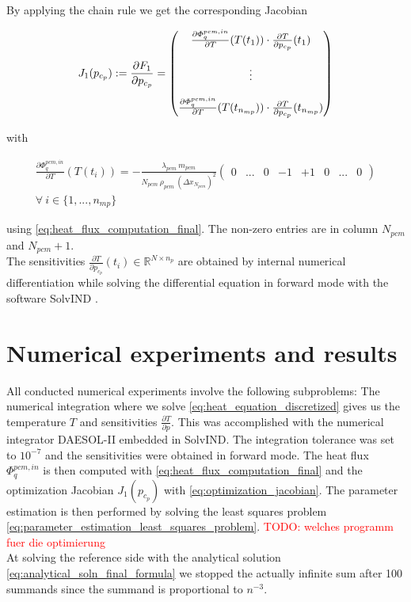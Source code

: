 \documentclass{scrartcl}[12pt, halfparskip]
\newcommand{\todo}[1]{\textcolor{red}{TODO: #1}}
\begin{document}
By applying the chain rule we get the corresponding Jacobian

\begin{equation}
	J_1(p_{c_p}) := \frac{\partial F_1}{\partial p_{c_p}} =
	\begin{pmatrix}
		\frac{\partial \varPhi_{q}^{pcm,in}}{\partial T}(T(t_1)) \cdot \frac{\partial T}{\partial p_{c_p}}(t_1) \\
		\textcolor{white}{} \\
		\vdots \\
		\textcolor{white}{} \\
		\frac{\partial \varPhi_{q}^{pcm,in}}{\partial T}(T(t_{n_{mp}})) \cdot \frac{\partial T}{\partial p_{c_p}}(t_{n_{mp}}) \\
	\end{pmatrix}
	\label{eq:optimization_jacobian}
\end{equation}

with

\begin{align}
	\frac{\partial \varPhi_{q}^{pcm,in}}{\partial T}(T(t_i)) = - \frac{\lambda_{pcm} \ m_{pcm}}{N_{pcm} \ \rho_{pcm} \ (\Delta x_{N_{pcm}})^2}
	\begin{pmatrix}
	0 & ... & 0 & -1 & +1 & 0 & ... & 0
	\end{pmatrix}\\
	\forall \ i \in \{1,...,n_{mp} \} \nonumber
\end{align}

using \eqref{eq:heat_flux_computation_final}. The non-zero entries are in column $N_{pcm}$ and $N_{pcm}+1$. \\
The sensitivities $\frac{\partial T}{\partial p_{c_p}}(t_i) \in \mathbb{R}^{N \times n_p}$ are obtained by internal numerical differentiation while solving the differential equation in forward mode with the software SolvIND \cite{diss_jan}. \\




\section{Numerical experiments and results}
All conducted numerical experiments involve the following subproblems: The numerical integration where we solve \eqref{eq:heat_equation_discretized} gives us the temperature $T$ and sensitivities $\frac{\partial T}{\partial p}$. This was accomplished with the numerical integrator DAESOL-II embedded in SolvIND. The integration tolerance was set to $10^{-7}$ and the sensitivities were obtained in forward mode.
The heat flux $\varPhi_q^{pcm,in}$ is then computed with \eqref{eq:heat_flux_computation_final} and the optimization Jacobian $J_1(p_{c_p})$ with \eqref{eq:optimization_jacobian}. The parameter estimation is then performed by solving the least squares problem \eqref{eq:parameter_estimation_least_squares_problem}. \todo{welches programm fuer die optimierung} \\
At solving the reference side with the analytical solution \eqref{eq:analytical_soln_final_formula} we stopped the actually infinite sum after 100 summands since the summand is proportional to $n^{-3}$. \\
\end{document}

